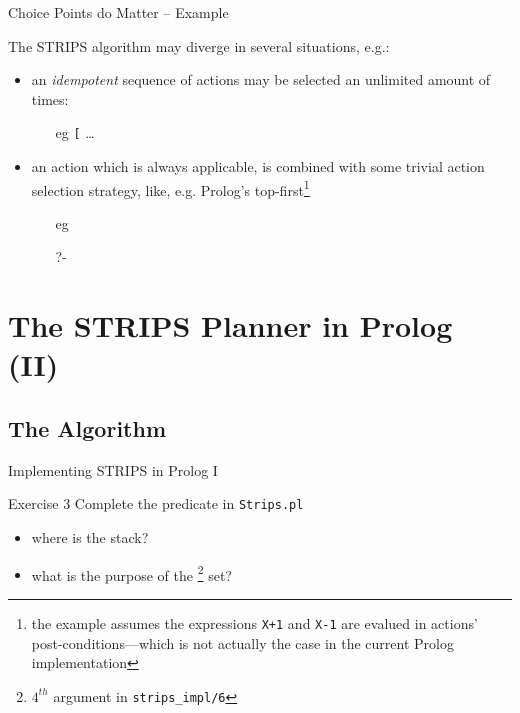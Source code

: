 \documentclass[presentation]{beamer}\mode<presentation>{\usetheme{AMSBolognaFC}}
\begin{document}
\begin{frame}[c]{Choice Points do Matter -- Example}

The STRIPS algorithm may diverge in several situations, e.g.:
%
\vfill
%
\begin{itemize}
    \item an \alert{\emph{idempotent}} sequence of actions may be selected an unlimited amount of times:
    \begin{itemize}
        \item[eg] \texttt{[} \ldots
    \end{itemize}

    \vfill

    \item an action which is always applicable, is combined with some trivial action selection strategy, like, e.g. Prolog's top-first\footnote{the example assumes the expressions \texttt{X+1} and \texttt{X-1} are \alert{evalued} in actions' post-conditions---which is not actually the case in the current Prolog implementation}
    \begin{itemize}\scriptsize
        \item[eg] 
        \\

        \item[]

        \item[?-] 
    \end{itemize}
\end{itemize}

\end{frame}


\section{The STRIPS Planner in Prolog (II)}

\subsection{The Algorithm}

\begin{frame}[c]{Implementing STRIPS in Prolog I}

    \begin{block}{Exercise 3}
        Complete the  predicate in \texttt{Strips.pl}
    \end{block}
	
    \begin{itemize}
        \item where is the stack?
        \item what is the purpose of the \footnote{$4^{th}$ argument in \texttt{strips\_impl/6}} set?
    \end{itemize}

\end{frame}
\end{document}
